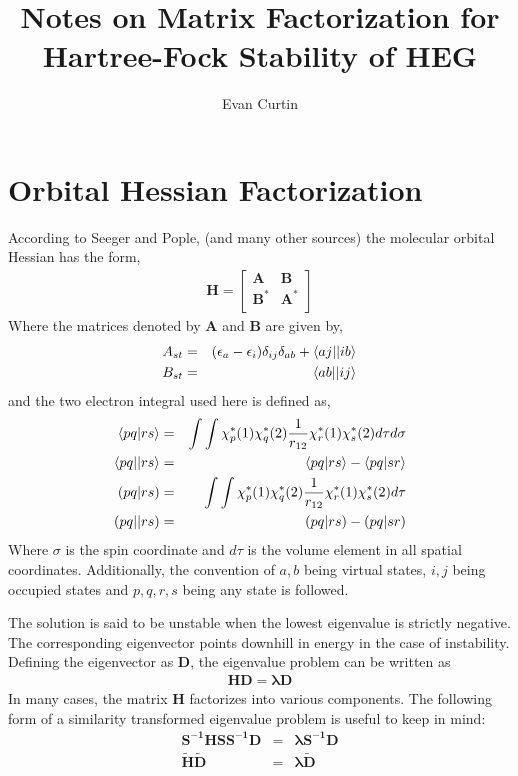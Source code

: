 \documentclass{revtex4}
\newcommand{\e}{\textcolor{myred}{\left(\epsilon_a-\epsilon_i\right)}}
\newcommand{\diag}{\textcolor{myred}{\delta_{ij}\delta_{ab}}}
\begin{document}
\title{Notes on Matrix Factorization for Hartree-Fock Stability of HEG}
\author{Evan Curtin}
\maketitle

\section{Orbital Hessian Factorization}
According to Seeger and Pople\cite{Seeger1977}, (and many other sources) the molecular orbital
Hessian has the form,
\begin{eqnarray}\label{basic}
\mathbf{H} =
  \begin{bmatrix}
    \mathbf{A}   & \mathbf{B}   \\
    \mathbf{B^*} & \mathbf{A^*} \\
  \end{bmatrix}
\end{eqnarray}
Where the matrices denoted by $\mathbf{A}$ and $\mathbf{B}$ are given by,
\begin{eqnarray}
  A_{st} &=& \e\diag +  \textcolor{myred}{\braket{aj||ib}} \\
  B_{st} &=& \textcolor{myblue}{\braket{ab||ij}}         
\end{eqnarray}
and the two electron integral used here is defined as, 
\begin{eqnarray}
  \braket{pq|rs} &=& \int\int \chi^*_p(1) \chi^*_q(2) \frac{1}{r_{12}} \chi^*_r(1) 
  \chi^*_s(2)
  d\tau d\sigma \\
  \braket{pq||rs} &=& \braket{pq|rs} - \braket{pq|sr} \\
  (pq|rs) &=& \int\int \chi^*_p(1) \chi^*_q(2) \frac{1}{r_{12}} \chi^*_r(1) 
  \chi^*_s(2)
  d\tau \\
  (pq||rs) &=& (pq|rs) - (pq|sr)
\end{eqnarray}
Where $\sigma$ is the spin coordinate and $d\tau$ is the volume element in all spatial coordinates.
Additionally, the convention of $a, b$ being virtual states, $i, j$ being occupied states and 
$p, q, r, s$ being any state is followed.  

The solution is said to be unstable when the lowest eigenvalue is strictly negative. The
corresponding eigenvector points downhill in energy in the case of instability. Defining
the eigenvector as $\mathbf{D}$, the eigenvalue problem can be written as
\begin{eqnarray}
  \mathbf{HD = \lambda D}
\end{eqnarray}
In many cases, the matrix $\mathbf{H}$ factorizes into various components. The following
form of a similarity transformed eigenvalue problem is useful to keep in mind:
\begin{eqnarray}
  \mathbf{S^{-1} H S S^{-1} D} &=& \mathbf{\lambda S^{-1} D} \\
  \mathbf{\tilde H \tilde D} &=& \mathbf{\lambda \tilde D}   
\end{eqnarray} 
\end{document}
